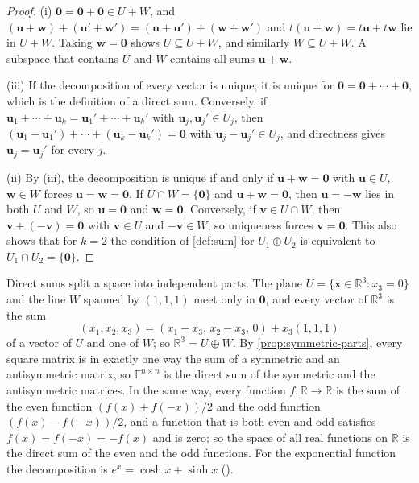 \begin{proof}
(i) $\mathbf 0=\mathbf 0+\mathbf 0\in U+W$, and $(\mathbf u+\mathbf w)+(\mathbf u'+\mathbf w')=(\mathbf u+\mathbf u')+(\mathbf w+\mathbf w')$ and $t(\mathbf u+\mathbf w)=t\mathbf u+t\mathbf w$ lie in $U+W$. Taking $\mathbf w=\mathbf 0$ shows $U\subseteq U+W$, and similarly $W\subseteq U+W$. A subspace that contains $U$ and $W$ contains all sums $\mathbf u+\mathbf w$.

(iii) If the decomposition of every vector is unique, it is unique for $\mathbf 0=\mathbf 0+\cdots+\mathbf 0$, which is the definition of a direct sum. Conversely, if $\mathbf u_1+\cdots+\mathbf u_k=\mathbf u_1'+\cdots+\mathbf u_k'$ with $\mathbf u_j,\mathbf u_j'\in U_j$, then $(\mathbf u_1-\mathbf u_1')+\cdots+(\mathbf u_k-\mathbf u_k')=\mathbf 0$ with $\mathbf u_j-\mathbf u_j'\in U_j$, and directness gives $\mathbf u_j=\mathbf u_j'$ for every $j$.

(ii) By (iii), the decomposition is unique if and only if $\mathbf u+\mathbf w=\mathbf 0$ with $\mathbf u\in U$, $\mathbf w\in W$ forces $\mathbf u=\mathbf w=\mathbf 0$. If $U\cap W=\{\mathbf 0\}$ and $\mathbf u+\mathbf w=\mathbf 0$, then $\mathbf u=-\mathbf w$ lies in both $U$ and $W$, so $\mathbf u=\mathbf 0$ and $\mathbf w=\mathbf 0$. Conversely, if $\mathbf v\in U\cap W$, then $\mathbf v+(-\mathbf v)=\mathbf 0$ with $\mathbf v\in U$ and $-\mathbf v\in W$, so uniqueness forces $\mathbf v=\mathbf 0$. This also shows that for $k=2$ the condition of \cref{def:sum} for $U_1\oplus U_2$ is equivalent to $U_1\cap U_2=\{\mathbf 0\}$.
\end{proof}

Direct sums split a space into independent parts. The plane $U=\{\mathbf x\in\mathbb R^3: x_3=0\}$ and the line $W$ spanned by $(1,1,1)$ meet only in $\mathbf 0$, and every vector of $\mathbb R^3$ is the sum
\[
(x_1,x_2,x_3)=(x_1-x_3,\,x_2-x_3,\,0)+x_3(1,1,1)
\]
of a vector of $U$ and one of $W$; so $\mathbb R^3=U\oplus W$. By \cref{prop:symmetric-parts}, every square matrix is in exactly one way the sum of a symmetric and an antisymmetric matrix, so $\mathbb F^{n\times n}$ is the direct sum of the symmetric and the antisymmetric matrices. In the same way, every function $f\colon\mathbb R\to\mathbb R$ is the sum of the even function $(f(x)+f(-x))/2$ and the odd function $(f(x)-f(-x))/2$, and a function that is both even and odd satisfies $f(x)=f(-x)=-f(x)$ and is zero; so the space of all real functions on $\mathbb R$ is the direct sum of the even and the odd functions. For the exponential function the decomposition is $e^x=\cosh x+\sinh x$ ().

